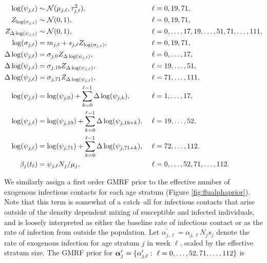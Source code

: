\begin{footnotesize}
	\begin{align}
	\log(\psi_{j,\ell}) &\sim \mcN(\mu_{j,\ell},\tau_{j,\ell}^2),&\ &\ell= 0,19,71, \nonumber\\
	Z_{\log(\sigma_{j,\ell})} &\sim \mcN(0,1),&\ &\ell=0,19,71, \nonumber \\
	Z_{\Delta\log(\psi_{j,\ell})} &\sim \mcN(0,1),&\ &\ell=0,\dots,17,19,\dots,51,71,\dots,111, \nonumber \\ 
	\log(\sigma_{j,\ell}) &= m_{j,\ell} + s_{j,\ell}Z_{\log(\sigma_{j,\ell})},&\ &\ell = 0,19,71,\nonumber\\
	\Delta\log(\psi_{j,\ell})&= \sigma_{j,0} Z_{\Delta\log(\psi_{j,\ell})},&\ &\ell=0,\dots,17, \nonumber\\
	\Delta\log(\psi_{j,\ell})&= \sigma_{j,19} Z_{\Delta\log(\psi_{j,\ell})},&\ &\ell=19,\dots,51, \nonumber\\
	\Delta\log(\psi_{j,\ell})&= \sigma_{j,71} Z_{\Delta\log(\psi_{j,\ell})},&\ &\ell=71,\dots,111, \nonumber\\
	\log(\psi_{j,\ell}) &= \log(\psi_{j,0}) + \sum_{k=0}^{\ell-1}\Delta\log(\psi_{j,k}),&\ &\ell = 1,\dots,17, \nonumber\\
	\log(\psi_{j,\ell}) &= \log(\psi_{j,19}) + \sum_{k=0}^{\ell-1}\Delta\log(\psi_{j,19+k}),&\ &\ell = 19,\dots,52, \nonumber\\
	\log(\psi_{j,\ell}) &= \log(\psi_{j,71}) + \sum_{k=0}^{\ell-1}\Delta\log(\psi_{j,71+k}),&\ &\ell = 72,\dots,112. \nonumber \\
	\beta_j(t_\ell) &= \psi_{j,\ell}N_j/ \mu_{j},&\ &\ell=0,\dots,52,71,\dots,112. \nonumber
	\end{align}
\end{footnotesize}

We similarly assign a first order GMRF prior to the effective number of exogenous infectious contacts for each age stratum (Figure \ref{fig:flualphaprior}). Note that this term is somewhat of a catch--all for infectious contacts that arise outside of the density dependent mixing of susceptible and infected individuals, and is loosely interpreted as either the baseline rate of infectious contact or as the rate of infection from outside the population. Let $ \alpha^\prime_{j,\ell} = \alpha_{j,\ell}N_js_j $ denote the rate of exogenous infection for age stratum $ j $ in week $ \ell $, scaled by the effective stratum size. The GMRF prior for $ \balpha^\prime_j = \lbrace\alpha^\prime_{j,\ell}:\ \ell=0,\dots,52,71,\dots,112\rbrace $ is

